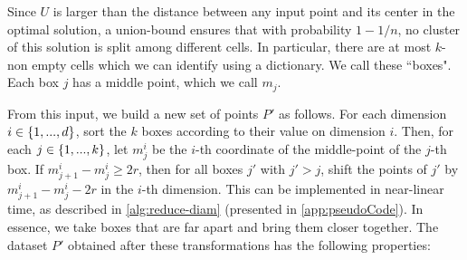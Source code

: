 Since $U$ is larger than the distance between any input point and its center in the optimal solution, a union-bound ensures that with probability $1-1/n$, no
cluster of this solution is split among different cells.  In particular, there are at most $k$-non empty cells which we can identify using a dictionary.  We
call these ``boxes".%
Each box $j$ has a middle point, which we call $m_j$.

From this input, we build a new set of points $P'$ as follows.  For each dimension $i \in \left\{ 1, ..., d \right\}$, sort the $k$ boxes according to their value on
dimension $i$. Then, for each $j \in \left\{ 1, ..., k\right\}$, let $m^i_j$  be the $i$-th coordinate of the middle-point of the $j$-th box. If $m^i_{j+1} - m^i_j
\geq 2r$, then for all boxes $j'$ with $j' > j$, shift the points of $j'$ by $m^i_{j+1} - m^i_j - 2r$ in the $i$-th dimension. This can be implemented in
near-linear time, as described in \cref{alg:reduce-diam} (presented in \cref{app:pseudoCode}). In essence, we take boxes that are far apart and bring them
closer together. The dataset $P'$ obtained after these transformations has the following properties:


